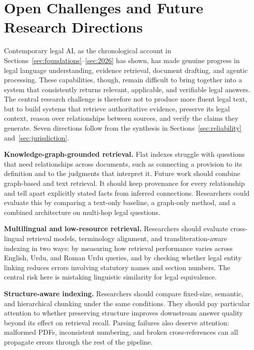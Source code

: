 \section{Open Challenges and Future Research Directions}
\label{sec:future}

Contemporary legal AI, as the chronological account in Sections~\ref{sec:foundations}--\ref{sec:2026}
has shown, has made genuine progress in legal language understanding, evidence retrieval, document
drafting, and agentic processing. These capabilities, though, remain difficult to bring together
into a system that consistently returns relevant, applicable, and verifiable legal answers. The
central research challenge is therefore not to produce more fluent legal text, but to build systems
that retrieve authoritative evidence, preserve its legal context, reason over relationships between
sources, and verify the claims they generate. Seven directions follow from the synthesis in
Sections~\ref{sec:reliability} and~\ref{sec:jurisdiction}.

\textbf{Knowledge-graph-grounded retrieval.} Flat indexes struggle with questions that need
relationships across documents, such as connecting a provision to its definition and to the
judgments that interpret it. Future work should combine graph-based and text retrieval. It should
keep provenance for every relationship and tell apart explicitly stated facts from inferred
connections. Researchers could evaluate this by comparing a text-only baseline, a graph-only
method, and a combined architecture on multi-hop legal questions.

\textbf{Multilingual and low-resource retrieval.} Researchers should evaluate cross-lingual
retrieval models, terminology alignment, and transliteration-aware indexing in two ways: by
measuring how retrieval performance varies across English, Urdu, and Roman Urdu queries, and by
checking whether legal entity linking reduces errors involving statutory names and section numbers.
The central risk here is mistaking linguistic similarity for legal equivalence.

\textbf{Structure-aware indexing.} Researchers should compare fixed-size, semantic, and hierarchical
chunking under the same conditions. They should pay particular attention to whether preserving
structure improves downstream answer quality beyond its effect on retrieval recall. Parsing
failures also deserve attention: malformed PDFs, inconsistent numbering, and broken cross-references
can all propagate errors through the rest of the pipeline.

